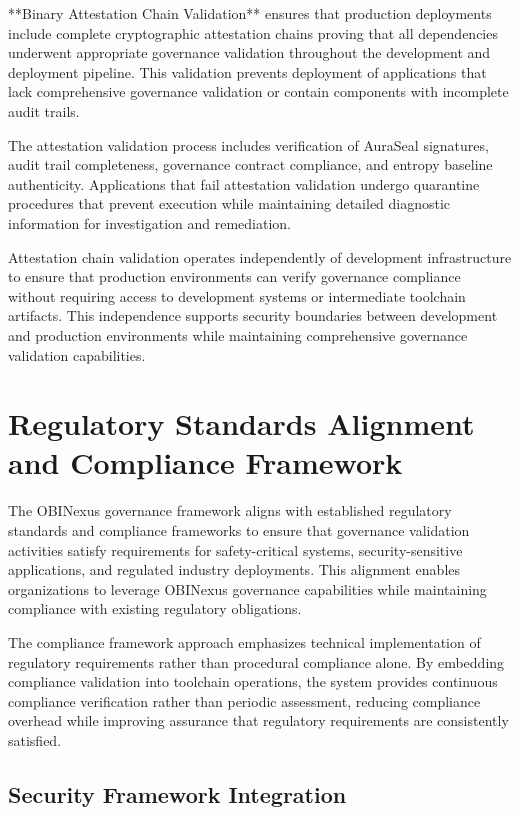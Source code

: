 **Binary Attestation Chain Validation** ensures that production deployments include complete cryptographic attestation chains proving that all dependencies underwent appropriate governance validation throughout the development and deployment pipeline. This validation prevents deployment of applications that lack comprehensive governance validation or contain components with incomplete audit trails.

The attestation validation process includes verification of AuraSeal signatures, audit trail completeness, governance contract compliance, and entropy baseline authenticity. Applications that fail attestation validation undergo quarantine procedures that prevent execution while maintaining detailed diagnostic information for investigation and remediation.

Attestation chain validation operates independently of development infrastructure to ensure that production environments can verify governance compliance without requiring access to development systems or intermediate toolchain artifacts. This independence supports security boundaries between development and production environments while maintaining comprehensive governance validation capabilities.

\section{Regulatory Standards Alignment and Compliance Framework}

The OBINexus governance framework aligns with established regulatory standards and compliance frameworks to ensure that governance validation activities satisfy requirements for safety-critical systems, security-sensitive applications, and regulated industry deployments. This alignment enables organizations to leverage OBINexus governance capabilities while maintaining compliance with existing regulatory obligations.

The compliance framework approach emphasizes technical implementation of regulatory requirements rather than procedural compliance alone. By embedding compliance validation into toolchain operations, the system provides continuous compliance verification rather than periodic assessment, reducing compliance overhead while improving assurance that regulatory requirements are consistently satisfied.

\subsection{Security Framework Integration}

